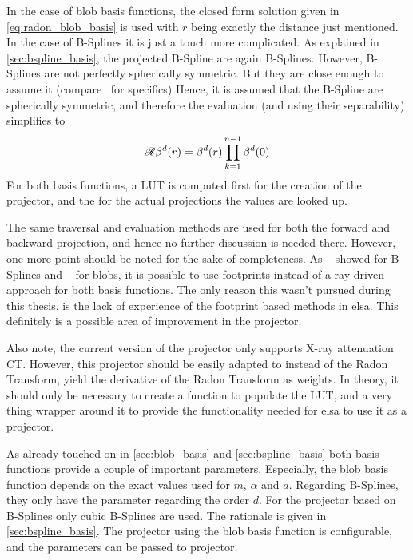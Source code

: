 In the case of blob basis functions, the closed form solution given in \autoref{eq:radon_blob_basis}
is used with \(r\) being exactly the distance just mentioned. In the case of B-Splines it is just a
touch more complicated. As explained in \autoref{sec:bspline_basis}, the projected B-Spline are
again B-Splines. However, B-Splines are not perfectly spherically symmetric. But they are close
enough to assume it (compare~\cite{momey_b-spline_2012, momey_spline_2015} for specifics) Hence, it
is assumed that the B-Spline are spherically symmetric, and therefore the evaluation (and using
their separability) simplifies to
\begin{equation}
	\mathscr{R}\beta^d(r) = \beta^d(r) \prod^{n - 1}_{k=1} \beta^d(0)
\end{equation}
For both basis functions, a \gls{LUT} is computed first for the creation of the projector, and the
for the actual projections the values are looked up.

The same traversal and evaluation methods are used for both the forward and backward projection, and
hence no further discussion is needed there. However, one more point should be noted for the sake of
completeness. As \citeauthor*{momey_spline_2015}~\cite{momey_spline_2015} showed for B-Splines and
\citeauthor*{kohler_iterative_2011}~\cite{kohler_iterative_2011} for blobs, it is possible to use
footprints instead of a ray-driven approach for both basis functions. The only reason this wasn't
pursued during this thesis, is the lack of experience of the footprint based methods in elsa. This
definitely is a possible area of improvement in the projector.

Also note, the current version of the projector only supports X-ray attenuation CT\@. However, this
projector should be easily adapted to instead of the Radon Transform, yield the derivative of the
Radon Transform as weights. In theory, it should only be necessary to create a function to populate
the \gls{LUT}, and a very thing wrapper around it to provide the functionality needed for elsa to
use it as a projector.

As already touched on in \autoref{sec:blob_basis} and \autoref{sec:bspline_basis} both basis
functions provide a couple of important parameters. Especially, the blob basis function depends on
the exact values used for \(m\), \(\alpha\) and \(a\). Regarding B-Splines, they only have the
parameter regarding the order \(d\). For the projector based on B-Splines only cubic B-Splines are
used. The rationale is given in \autoref{sec:bspline_basis}. The projector using the blob basis
function is configurable, and the parameters can be passed to projector.

